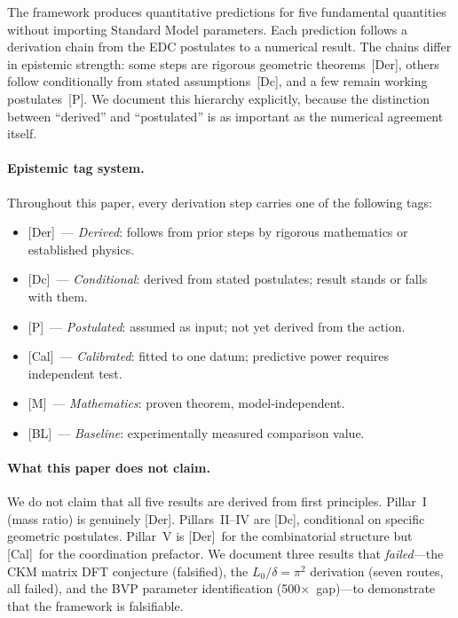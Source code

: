 \documentclass[12pt,a4paper]{article}
\theoremstyle{definition}
\theoremstyle{remark}
\newcommand{\tagDer}{\textsf{[Der]}}
\newcommand{\tagDc}{\textsf{[Dc]}}
\newcommand{\tagP}{\textsf{[P]}}
\newcommand{\tagCal}{\textsf{[Cal]}}
\newcommand{\tagBL}{\textsf{[BL]}}
\newcommand{\tagM}{\textsf{[M]}}
\begin{document}
The framework produces quantitative predictions for five fundamental
quantities without importing Standard Model parameters.  Each
prediction follows a derivation chain from the EDC postulates to a
numerical result.  The chains differ in epistemic strength: some steps
are rigorous geometric theorems~\tagDer, others follow conditionally
from stated assumptions~\tagDc, and a few remain working
postulates~\tagP.  We document this hierarchy explicitly, because the
distinction between ``derived'' and ``postulated'' is as important as
the numerical agreement itself.

\paragraph{Epistemic tag system.}
Throughout this paper, every derivation step carries one of the
following tags:
\begin{itemize}[nosep]
\item \tagDer\ --- \emph{Derived}: follows from prior steps by
  rigorous mathematics or established physics.
\item \tagDc\ --- \emph{Conditional}: derived from stated postulates;
  result stands or falls with them.
\item \tagP\ --- \emph{Postulated}: assumed as input; not yet derived
  from the action.
\item \tagCal\ --- \emph{Calibrated}: fitted to one datum; predictive
  power requires independent test.
\item \tagM\ --- \emph{Mathematics}: proven theorem, model-independent.
\item \tagBL\ --- \emph{Baseline}: experimentally measured comparison
  value.
\end{itemize}

\paragraph{What this paper does not claim.}
We do not claim that all five results are derived from first
principles.  Pillar~I (mass ratio) is genuinely \tagDer.
Pillars~II--IV are \tagDc, conditional on specific geometric
postulates.  Pillar~V is \tagDer\ for the combinatorial structure
but \tagCal\ for the coordination prefactor.  We document three
results that \emph{failed}---the CKM matrix DFT conjecture
(falsified), the $L_0/\delta = \pi^2$ derivation (seven routes, all
failed), and the BVP parameter identification (500$\times$~gap)---to
demonstrate that the framework is falsifiable.
\end{document}
